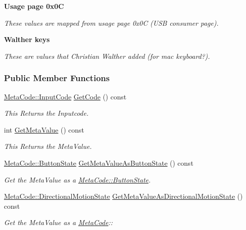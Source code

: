 \begin{Indent}{\bf Usage page 0x0C}\par
{\em These values are mapped from usage page 0x0C (USB consumer page). }\end{Indent}
\begin{Indent}{\bf Walther keys}\par
{\em These are values that Christian Walther added (for mac keyboard?). }\end{Indent}
\subsubsection*{Public Member Functions}
\begin{DoxyCompactItemize}
\item 
\hyperlink{classMezzanine_1_1MetaCode_a3b5633f0145bf3287cf53a3f05b5563c}{MetaCode::InputCode} \hyperlink{classMezzanine_1_1MetaCode_a83484f23e49db65d343d2ea75c9af66c}{GetCode} () const 
\begin{DoxyCompactList}\small\item\em This Returns the Inputcode. \item\end{DoxyCompactList}\item 
int \hyperlink{classMezzanine_1_1MetaCode_a650c4ae1fb698233516d978dd83dfca7}{GetMetaValue} () const 
\begin{DoxyCompactList}\small\item\em This Returns the MetaValue. \item\end{DoxyCompactList}\item 
\hyperlink{classMezzanine_1_1MetaCode_a65b6d86ef846369bd8f3fd944a455fd0}{MetaCode::ButtonState} \hyperlink{classMezzanine_1_1MetaCode_a6b106f781c0f7be4442cf45c7696d339}{GetMetaValueAsButtonState} () const 
\begin{DoxyCompactList}\small\item\em Get the MetaValue as a \hyperlink{classMezzanine_1_1MetaCode_a65b6d86ef846369bd8f3fd944a455fd0}{MetaCode::ButtonState}. \item\end{DoxyCompactList}\item 
\hyperlink{classMezzanine_1_1MetaCode_ad37143a88b8c94cb6b2f40f5d66104ad}{MetaCode::DirectionalMotionState} \hyperlink{classMezzanine_1_1MetaCode_a03033262ac8632a8a7567f7ca0dc9975}{GetMetaValueAsDirectionalMotionState} () const 
\begin{DoxyCompactList}\small\item\em Get the MetaValue as a \hyperlink{classMezzanine_1_1MetaCode}{MetaCode}:: \item\end{DoxyCompactList}\item 

\end{DoxyCompactItemize}

